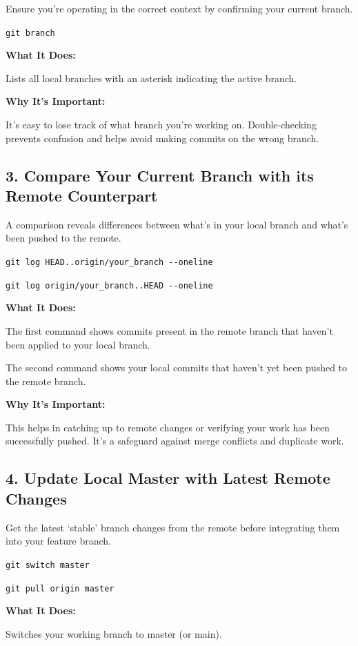 \documentclass[
  letterpaper,
  DIV=11,
  numbers=noendperiod]{scrartcl}
\begin{document}
Ensure you're operating in the correct context by confirming your
current branch.

\texttt{git\ branch}

\textbf{What It Does:}

Lists all local branches with an asterisk indicating the active branch.

\textbf{Why It's Important:}

It's easy to lose track of what branch you're working on.
Double-checking prevents confusion and helps avoid making commits on the
wrong branch.

\subsection{3. Compare Your Current Branch with its Remote
Counterpart}\label{compare-your-current-branch-with-its-remote-counterpart}

A comparison reveals differences between what's in your local branch and
what's been pushed to the remote.

\texttt{git\ log\ HEAD..origin/your\_branch\ -\/-oneline}

\texttt{git\ log\ origin/your\_branch..HEAD\ -\/-oneline}

\textbf{What It Does:}

The first command shows commits present in the remote branch that
haven't been applied to your local branch.

The second command shows your local commits that haven't yet been pushed
to the remote branch.

\textbf{Why It's Important:}

This helps in catching up to remote changes or verifying your work has
been successfully pushed. It's a safeguard against merge conflicts and
duplicate work.

\subsection{4. Update Local Master with Latest Remote
Changes}\label{update-local-master-with-latest-remote-changes}

Get the latest `stable' branch changes from the remote before
integrating them into your feature branch.

\texttt{git\ switch\ master}

\texttt{git\ pull\ origin\ master}

\textbf{What It Does:}

Switches your working branch to master (or main).
\end{document}
